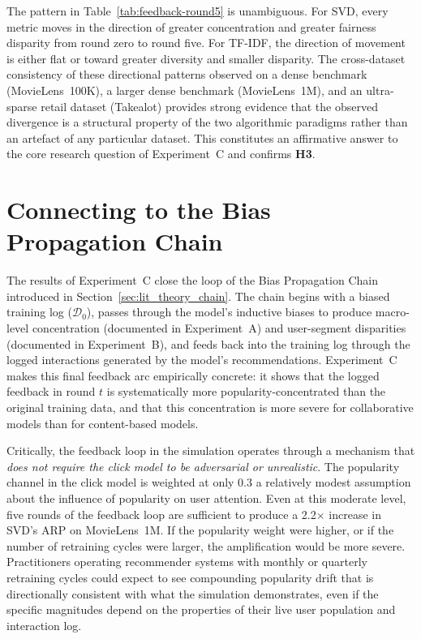 \documentclass[11pt,a4paper]{report}
\begin{document}
The pattern in Table~\ref{tab:feedback-round5} is unambiguous. For SVD, every metric moves in the direction of greater concentration and greater fairness disparity from round zero to round five. For TF-IDF, the direction of movement is either flat or toward greater diversity and smaller disparity. The cross-dataset consistency of these directional patterns observed on a dense benchmark (MovieLens~100K), a larger dense benchmark (MovieLens~1M), and an ultra-sparse retail dataset (Takealot) provides strong evidence that the observed divergence is a structural property of the two algorithmic paradigms rather than an artefact of any particular dataset. This constitutes an affirmative answer to the core research question of Experiment~C and confirms \textbf{H3}.

\section{Connecting to the Bias Propagation Chain}
\label{sec:expc_chain}

The results of Experiment~C close the loop of the Bias Propagation Chain introduced in Section~\ref{sec:lit_theory_chain}. The chain begins with a biased training log ($\mathcal{D}_0$), passes through the model's inductive biases to produce macro-level concentration (documented in Experiment~A) and user-segment disparities (documented in Experiment~B), and feeds back into the training log through the logged interactions generated by the model's recommendations. Experiment~C makes this final feedback arc empirically concrete: it shows that the logged feedback in round $t$ is systematically more popularity-concentrated than the original training data, and that this concentration is more severe for collaborative models than for content-based models.

Critically, the feedback loop in the simulation operates through a mechanism that \emph{does not require the click model to be adversarial or unrealistic}. The popularity channel in the click model is weighted at only $0.3$ a relatively modest assumption about the influence of popularity on user attention. Even at this moderate level, five rounds of the feedback loop are sufficient to produce a 2.2$\times$ increase in SVD's ARP on MovieLens~1M. If the popularity weight were higher, or if the number of retraining cycles were larger, the amplification would be more severe. Practitioners operating recommender systems with monthly or quarterly retraining cycles could expect to see compounding popularity drift that is directionally consistent with what the simulation demonstrates, even if the specific magnitudes depend on the properties of their live user population and interaction log.
\end{document}
